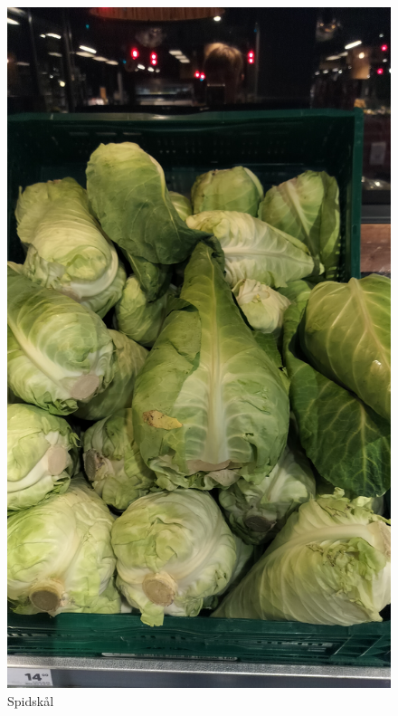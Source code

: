 \documentclass{book}
\begin{document}
\begin{figure}
    \centering
    \includegraphics[width=0.5\linewidth]{Spidskål.jpg}
    \caption{Spidskål}
\end{figure}

\end{document}

